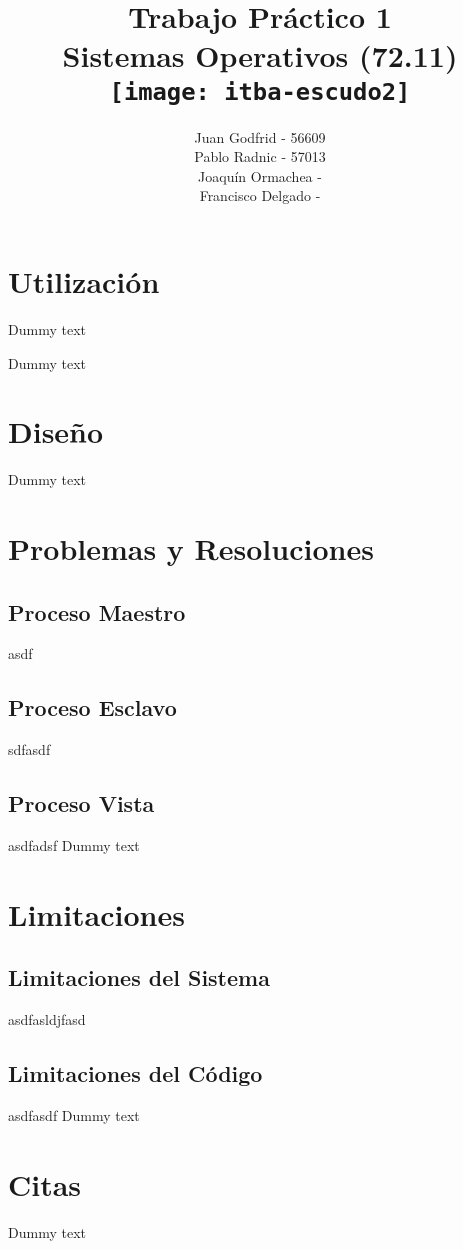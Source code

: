 \documentclass[10pt,a4paper]{report}
\title{
	\bf\color{darkcerulean} Trabajo Práctico 1 \\
	\color{black}Sistemas Operativos (72.11) \\
	\texttt{[image: itba-escudo2]}
	}
\author{Juan Godfrid - 56609 \\Pablo Radnic - 57013 \\ Joaquín Ormachea - \\Francisco Delgado -}
\begin{document}
\maketitle

\newpage
\tableofcontents
\newpage

\chapter{Utilización}

Dummy text


Dummy text

\chapter{Diseño}

Dummy text

\chapter{Problemas y Resoluciones}
\section{Proceso Maestro}
asdf
\section{Proceso Esclavo}
sdfasdf
\section{Proceso Vista}
asdfadsf
Dummy text

\chapter{Limitaciones}
\section{Limitaciones del Sistema}
asdfasldjfasd

\section{Limitaciones del Código}
asdfasdf
Dummy text

\chapter{Citas}

Dummy text
\end{document}

